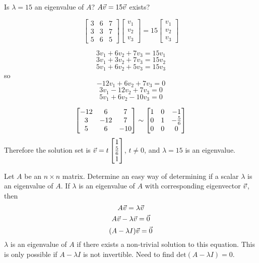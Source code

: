 \documentclass[english, 12pt]{article}
\begin{document}
\begin{exmp}
Is $\lambda = 15$ an eigenvalue of $A$? $A\vec{v} = 15\vec{v}$ exists?

\begin{sol}
\[\begin{bmatrix} 3 & 6 & 7 \\ 3 & 3 & 7 \\ 5 & 6 & 5 \end{bmatrix} \begin{bmatrix} v_{1} \\ v_{2} \\ v_{3} \end{bmatrix} = 15 \begin{bmatrix} v_{1} \\ v_{2} \\ v_{3} \end{bmatrix}\]

\[3v_{1} + 6 v_{2} + 7 v_{3} = 15v_{1}\]
\[3v_{1} + 3v_{2} + 7 v_{3} = 15v_{2}\]
\[5v_{1} + 6v_{2} + 5 v_{3} = 15v_{3}\]
so
\[-12v_{1} + 6 v_{2} + 7 v_{3} = 0\]
\[3v_{1}  -12v_{2} + 7 v_{3} = 0\]
\[5v_{1} + 6v_{2} - 10 v_{3} = 0\]

\[\begin{bmatrix} -12 & 6 & 7 \\ 3 & -12 & 7 \\ 5 & 6 & -10 \end{bmatrix} \sim \begin{bmatrix} 1 & 0 & -1 \\ 0 & 1 & -\frac{5}{6} \\ 0 & 0 & 0 \end{bmatrix}\]
Therefore the solution set is $\vec{v} = t \begin{bmatrix} 1 \\ \frac{5}{6} \\ 1 \end{bmatrix}$, $t \neq 0$, and $\lambda = 15$ is an eigenvalue.
\end{sol}
\end{exmp}

Let $A$ be an $n \times n$ matrix. Determine an easy way of determining if a scalar $\lambda$ is an eigenvalue of $A$. If $\lambda$ is an eigenvalue of $A$ with corresponding eigenvector $\vec{v}$, then
\[A\vec{v} = \lambda \vec{v}\]
\[A\vec{v} - \lambda \vec{v} = \vec{0}\]
\[(A - \lambda I) \vec{v} = \vec{0}\]
$\lambda$ is an eigenvalue of $A$ if there exists a non-trivial solution to this equation. This is only possible if $A - \lambda I$ is not invertible. Need to find $\text{det}(A - \lambda I) = 0$.
\end{document}
